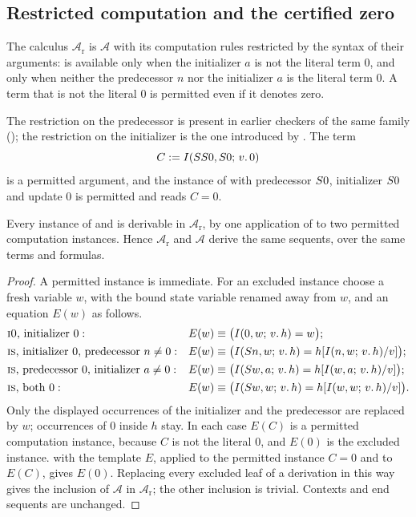 \subsection{Restricted computation and the certified zero}

\begin{definition}\label{cert:def:restricted}
The calculus $\mathcal A_{\mathrm r}$ is $\mathcal A$ with its computation
rules restricted by the syntax of their arguments:  is available
only when the initializer $a$ is not the literal term $0$, and 
only when neither the predecessor $n$ nor the initializer $a$ is the literal
term $0$. A term that is not the literal $0$ is permitted even if it denotes
zero.
\end{definition}

The restriction on the predecessor is present in earlier checkers of the same
family (); the restriction on the initializer is the
one introduced by . The term
\[
C\mathrel{:=}I(SS 0,S 0;\,v.\,0)
\]
is a permitted argument, and the instance of  with predecessor
$S 0$, initializer $S 0$ and update $0$ is permitted and reads $C=0$.

\begin{theorem}\label{cert:thm:certzero}
Every instance of  and  is derivable in
$\mathcal A_{\mathrm r}$, by one application of  to two permitted
computation instances. Hence $\mathcal A_{\mathrm r}$ and $\mathcal A$ derive
the same sequents, over the same terms and formulas.
\end{theorem}
\begin{proof}
A permitted instance is immediate. For an excluded instance choose a fresh
variable $w$, with the bound state variable renamed away from $w$, and an
equation $E(w)$ as follows.
\begin{align*}
&\text{\rulename{I0}, initializer }0:
 && E(w)\equiv\bigl(\It{0}{w}{v}{h}=w\bigr);\\
&\text{\rulename{IS}, initializer }0\text{, predecessor }n\neq 0:
 && E(w)\equiv\bigl(\It{\Suc n}{w}{v}{h}=h\subst{\It{n}{w}{v}{h}}{v}\bigr);\\
&\text{\rulename{IS}, predecessor }0\text{, initializer }a\neq 0:
 && E(w)\equiv\bigl(\It{\Suc w}{a}{v}{h}=h\subst{\It{w}{a}{v}{h}}{v}\bigr);\\
&\text{\rulename{IS}, both }0:
 && E(w)\equiv\bigl(\It{\Suc w}{w}{v}{h}=h\subst{\It{w}{w}{v}{h}}{v}\bigr).
\end{align*}
Only the displayed occurrences of the initializer and the predecessor are
replaced by $w$; occurrences of $0$ inside $h$ stay. In each case $E(C)$ is a
permitted computation instance, because $C$ is not the literal $0$, and $E(0)$
is the excluded instance.  with the template $E$, applied to the
permitted instance $C=0$ and to $E(C)$, gives $E(0)$. Replacing every excluded
leaf of a derivation in this way gives the inclusion of $\mathcal A$ in
$\mathcal A_{\mathrm r}$; the other inclusion is trivial. Contexts and end
sequents are unchanged.
\end{proof}

